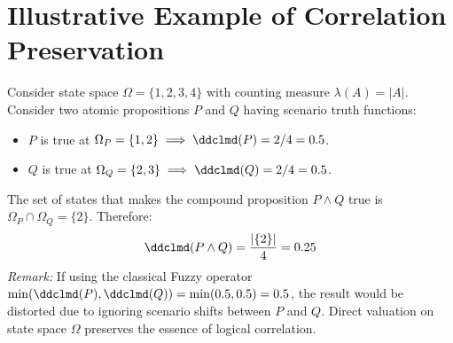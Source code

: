 \section{Illustrative Example of Correlation Preservation}
\begin{example}
	Consider state space $\Omega = \{1, 2, 3, 4\}$ with counting measure $\lambda(A) = |A|$. Consider two atomic propositions $P$ and $Q$ having scenario truth functions:
	\begin{itemize}
		\item $P$ is true at $\Omega_P = \{1, 2\} \implies \ddclmd(P) = 2/4 = 0.5$.
		\item $Q$ is true at $\Omega_Q = \{2, 3\} \implies \ddclmd(Q) = 2/4 = 0.5$.
	\end{itemize}
	The set of states that makes the compound proposition $P \land Q$ true is $\Omega_P \cap \Omega_Q = \{2\}$. Therefore:
	\[
	\ddclmd(P \land Q) = \frac{|\{2\}|}{4} = 0.25
	\]
	\textit{Remark:} If using the classical Fuzzy operator $\min(\ddclmd(P), \ddclmd(Q)) = \min(0.5, 0.5) = 0.5$, the result would be distorted due to ignoring scenario shifts between $P$ and $Q$. Direct valuation on state space $\Omega$ preserves the essence of logical correlation.
\end{example}